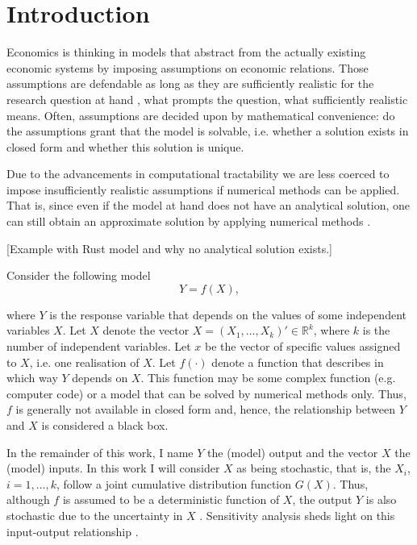 \section{Introduction} \label{intro}

Economics is thinking in models that abstract from the actually existing economic systems by imposing assumptions on economic relations. Those assumptions are defendable as long as they are sufficiently realistic for the research question at hand \citep{F66}, what prompts the question, what sufficiently realistic means. Often, assumptions are decided upon by mathematical convenience: do the assumptions grant that the model is solvable, i.e. whether a solution exists in closed form and whether this solution is unique.

Due to the advancements in computational tractability we are less coerced to impose insufficiently realistic assumptions if numerical methods can be applied. That is, since even if the model at hand does not have an analytical solution, one can still obtain an approximate solution by applying numerical methods \citep{MF04}.

[Example with Rust model and why no analytical solution exists.]

\noindent Consider the following model
\begin{equation*}
Y = f(X),
\end{equation*}

where $Y$ is the response variable that depends on the values of some independent variables $X$. Let $X$ denote the vector $X = (X_1, \dots, X_k)' \in \mathbb{R}^k$, where $k$ is the number of independent variables. Let $x$ be the vector of specific values assigned to $X$, i.e. one realisation of $X$. Let $f(\cdot)$ denote a function that describes in which way $Y$ depends on $X$. This function may be some complex function (e.g. computer code) or a model that can be solved by numerical methods only. Thus, $f$ is generally not available in closed form and, hence, the relationship between $Y$ and $X$ is considered a black box.

In the remainder of this work, I name $Y$ the (model) output and the vector $X$ the (model) inputs. In this work I will consider $X$ as being stochastic, that is, the $X_i$, $i = 1,\dots, k$, follow a joint cumulative distribution function $G(X)$. Thus, although $f$ is assumed to be a deterministic function of $X$, the output $Y$ is also stochastic due to the uncertainty in $X$ \citep{SNS16}. Sensitivity analysis sheds light on this input-output relationship \citep{BP16}.

